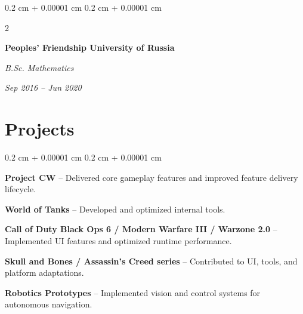 \documentclass[10pt, letterpaper]{article}
\newenvironment{onecolentry}{
    \begin{adjustwidth}{
        0.2 cm + 0.00001 cm
    }{
        0.2 cm + 0.00001 cm
    }
}{
    \end{adjustwidth}
} %
\newenvironment{twocolentry}[2][]{
    \onecolentry
    \def\secondColumn{#2}
    \setcolumnwidth{\fill, 4.5 cm}
    \begin{paracol}{2}
}{
    \switchcolumn \raggedleft \secondColumn
    \end{paracol}
    \endonecolentry
} %
\begin{document}
        \vspace{0.30 cm}
  
        \begin{twocolentry}{
            
            
        \textit{Sep 2016 – Jun 2020}}
            \textbf{Peoples' Friendship University of Russia}

            \textit{B.Sc. Mathematics}
        \end{twocolentry}
    
    \section{Projects}

        \begin{onecolentry}
            \item \textbf{Project CW} – Delivered core gameplay features and improved feature delivery lifecycle.
            \item \textbf{World of Tanks} – Developed and optimized internal tools.
            \item \textbf{Call of Duty Black Ops 6 / Modern Warfare III / Warzone 2.0} – Implemented UI features and optimized runtime performance.
            \item \textbf{Skull and Bones / Assassin’s Creed series} – Contributed to UI, tools, and platform adaptations.
            \item \textbf{Robotics Prototypes} – Implemented vision and control systems for autonomous navigation.
        \end{onecolentry}    
\end{document}

